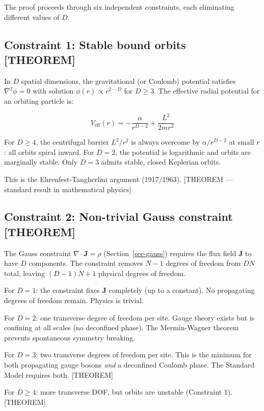 \documentclass[
  11pt,
  letterpaper,
  twoside,
  openright]{book}
\begin{document}
The proof proceeds through six independent constraints, each eliminating
different values of \(D\).

\subsection{Constraint 1: Stable bound orbits
{[}THEOREM{]}}\label{constraint-1-stable-bound-orbits-theorem}

In \(D\) spatial dimensions, the gravitational (or Coulomb) potential
satisfies \(\nabla^2 \phi = 0\) with solution
\(\phi(r) \propto r^{2-D}\) for \(D \geq 3\). The effective radial
potential for an orbiting particle is:

\[
V_{\text{eff}}(r) = -\frac{\alpha}{r^{D-2}} + \frac{L^2}{2mr^2}
\]

For \(D \geq 4\), the centrifugal barrier \(L^2/r^2\) is always overcome
by \(\alpha/r^{D-2}\) at small \(r\): all orbits spiral inward. For
\(D = 2\), the potential is logarithmic and orbits are marginally
stable. Only \(D = 3\) admits stable, closed Keplerian orbits.

This is the Ehrenfest-Tangherlini argument (1917/1963). {[}THEOREM ---
standard result in mathematical physics{]}

\subsection{Constraint 2: Non-trivial Gauss constraint
{[}THEOREM{]}}\label{constraint-2-non-trivial-gauss-constraint-theorem}

The Gauss constraint \(\nabla \cdot \mathbf{J} = \rho\)
(Section~\ref{sec-gauss}) requires the flux field \(\mathbf{J}\) to have
\(D\) components. The constraint removes \(N - 1\) degrees of freedom
from \(DN\) total, leaving \((D-1)N + 1\) physical degrees of freedom.

For \(D = 1\): the constraint fixes \(\mathbf{J}\) completely (up to a
constant). No propagating degrees of freedom remain. Physics is trivial.

For \(D = 2\): one transverse degree of freedom per site. Gauge theory
exists but is confining at all scales (no deconfined phase). The
Mermin-Wagner theorem prevents spontaneous symmetry breaking.

For \(D = 3\): two transverse degrees of freedom per site. This is the
minimum for both propagating gauge bosons \emph{and} a deconfined
Coulomb phase. The Standard Model requires both. {[}THEOREM{]}

For \(D \geq 4\): more transverse DOF, but orbits are unstable
(Constraint 1). {[}THEOREM{]}
\end{document}
